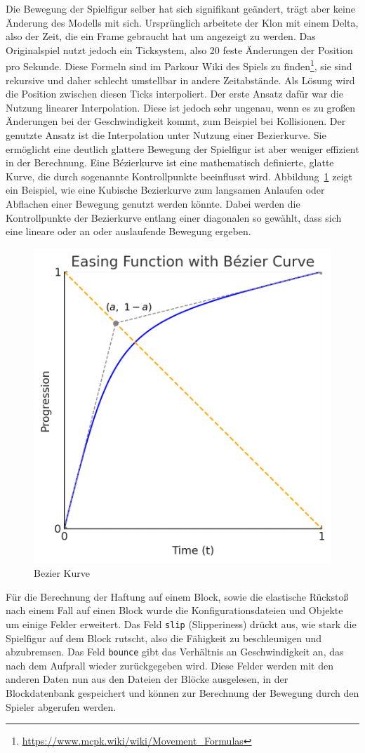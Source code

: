 \documentclass{article}
\begin{document}
Die Bewegung der Spielfigur selber hat sich signifikant geändert, trägt aber keine Änderung des Modells mit sich. Ursprünglich arbeitete der Klon mit einem Delta, also der Zeit, die ein Frame gebraucht hat um angezeigt zu werden. Das Originalspiel nutzt jedoch ein Ticksystem, also 20 feste Änderungen der Position pro Sekunde. Diese Formeln sind im Parkour Wiki des Spiels zu finden\footnote{\url{https://www.mcpk.wiki/wiki/Movement_Formulas}}, sie sind rekursive und daher schlecht umstellbar in andere Zeitabstände. Als Lösung wird die Position zwischen diesen Ticks interpoliert. Der erste Ansatz dafür war die Nutzung linearer Interpolation. Diese ist jedoch sehr ungenau, wenn es zu großen Änderungen bei der Geschwindigkeit kommt, zum Beispiel bei Kollisionen. Der genutzte Ansatz ist die Interpolation unter Nutzung einer Bezierkurve. Sie ermöglicht eine deutlich glattere Bewegung der Spielfigur ist aber weniger effizient in der Berechnung. Eine Bézierkurve ist eine mathematisch definierte, glatte Kurve, die durch sogenannte Kontrollpunkte beeinflusst wird. Abbildung~\ref{pic:bezier} zeigt ein Beispiel, wie eine Kubische Bezierkurve zum langsamen Anlaufen oder Abflachen einer Bewegung genutzt werden könnte. Dabei werden die Kontrollpunkte der Bezierkurve entlang einer diagonalen so gewählt, dass sich eine lineare oder an oder auslaufende Bewegung ergeben.

\begin{figure} [ht]
  \centering
  \includegraphics[width=.5\linewidth]{bezier.png}
  \caption{Bezier Kurve}
  \label{pic:bezier}
\end{figure}

Für die Berechnung der Haftung auf einem Block, sowie die elastische Rückstoß nach einem Fall auf einen Block wurde die Konfigurationsdateien und Objekte um einige Felder erweitert. Das Feld \texttt{slip} (Slipperiness) drückt aus, wie stark die Spielfigur auf dem Block rutscht, also die Fähigkeit zu beschleunigen und abzubremsen. Das Feld \texttt{bounce} gibt das Verhältnis an Geschwindigkeit an, das nach dem Aufprall wieder zurückgegeben wird. Diese Felder werden mit den anderen Daten nun aus den Dateien der Blöcke ausgelesen, in der Blockdatenbank gespeichert und können zur Berechnung der Bewegung durch den Spieler abgerufen werden.
\end{document}
